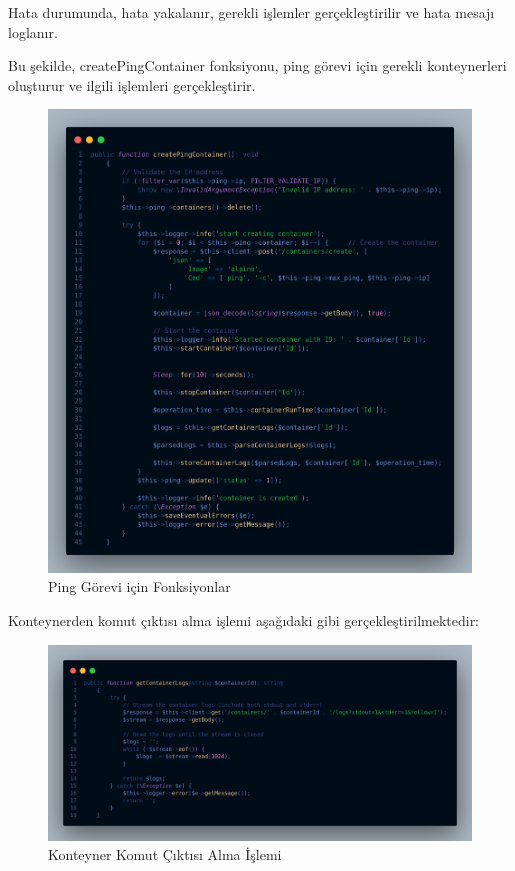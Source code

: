 Hata durumunda, hata yakalanır, gerekli işlemler gerçekleştirilir ve hata mesajı loglanır.

Bu şekilde, createPingContainer fonksiyonu, ping görevi için gerekli konteynerleri oluşturur ve ilgili işlemleri gerçekleştirir.

\begin{figure}[H]
	\centering
	\includegraphics[width=0.9\linewidth]{images/code_ping.png}
	\caption{Ping Görevi için Fonksiyonlar}
	\label{fig:ping_func}
\end{figure}

Konteynerden komut çıktısı alma işlemi aşağıdaki gibi gerçekleştirilmektedir:

\begin{figure}[H]
	\centering
	\includegraphics[width=0.8\linewidth]{images/code_log.png}
	\caption{Konteyner Komut Çıktısı Alma İşlemi}
	\label{fig:container_cmd_output}
\end{figure}

